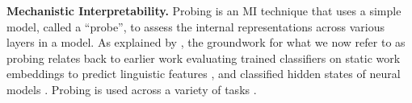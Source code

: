 \textbf{Mechanistic Interpretability.}
Probing is an MI technique that uses a simple model, called a “probe”, to assess the internal representations across various layers in a model. As explained by \citet{belinkov2018internal}, the groundwork for what we now refer to as probing relates back to earlier work evaluating trained classifiers on static work embeddings to predict linguistic features \cite{kohn2015s,gupta2015distributional}, and classified hidden states of neural models \cite{ettinger2016probing,kadar2017representation,shi2016does,adi2016fine,hupkes2018visualisation,belinkov2022probing, giulianelli2018under}. Probing is used across a variety of tasks \cite{hewitt2019designing, tenney2019bert,tenney2019you,peters2018dissecting,clark2019does,belinkov2018internal,conneau2018you}. 




